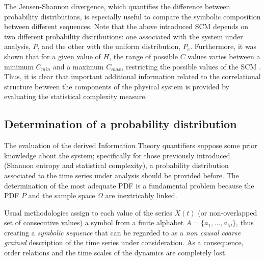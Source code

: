 The Jensen-Shannon divergence, which quantifies the difference between probability distributions, is especially useful to compare the symbolic composition between different sequences\cite{JS-Div1991,Grosse2002,JS-Div2014}.
Note that the above introduced SCM depends on two different probability distributions: one associated with the system under analysis, $P$, and the other with the uniform distribution, $P_e$.
Furthermore, it was shown that for a given value of $H$, the range of possible $C$ values varies between a minimum $C_{min}$ and a maximum $C_{max}$, restricting the possible values of the SCM \cite{Martin2006}.
Thus, it is clear that important additional information related to the correlational structure between the components of the physical system is provided by evaluating the statistical complexity measure. 

\subsection{Determination of a probability distribution}

The evaluation of the derived Information Theory quantifiers suppose some prior knowledge about the system; specifically for those previously introduced (Shannon entropy and statistical complexity), a probability distribution associated to the time series under analysis should be provided before.
The determination of the most adequate PDF is a fundamental problem because the PDF $P$ and the sample space $\Omega$ are inextricably linked. 

Usual methodologies assign to each value of the series $X(t)$ (or non-overlapped set of consecutive values) a symbol from a finite alphabet $A=\{a_1,\dots,a_M\}$, thus creating a {\it symbolic sequence} that can be regarded to as a {\it non causal coarse grained\/} description of the time series under consideration. 
As a consequence, order relations and the time scales of the dynamics are completely lost. 

